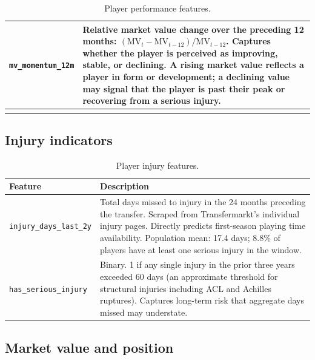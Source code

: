 \documentclass[12pt, a4paper, oneside]{report}
\begin{document}
\begin{longtable}{p{3.5cm} p{9.5cm}}
\texttt{mv\_momentum\_12m} & Relative market value change over the preceding 12 months: $(\text{MV}_{t} - \text{MV}_{t-12}) / \text{MV}_{t-12}$. Captures whether the player is perceived as improving, stable, or declining. A rising market value reflects a player in form or development; a declining value may signal that the player is past their peak or recovering from a serious injury. \\
\bottomrule
\caption{Player performance features.}
\label{tab:player_perf_features}
\end{longtable}

\subsection{Injury indicators}

\begin{table}[H]
\centering
\caption{Player injury features.}
\label{tab:injury_features}
\begin{tabular}{p{3.5cm} p{9.5cm}}
\toprule
\textbf{Feature} & \textbf{Description} \\
\midrule
\texttt{injury\_days\_last\_2y} & Total days missed to injury in the 24 months preceding the transfer. Scraped from Transfermarkt's individual injury pages. Directly predicts first-season playing time availability. Population mean: 17.4 days; 8.8\% of players have at least one serious injury in the window. \\[4pt]
\texttt{has\_serious\_injury} & Binary. 1 if any single injury in the prior three years exceeded 60 days (an approximate threshold for structural injuries including ACL and Achilles ruptures). Captures long-term risk that aggregate days missed may understate. \\
\bottomrule
\end{tabular}
\end{table}

\subsection{Market value and position}
\end{document}
